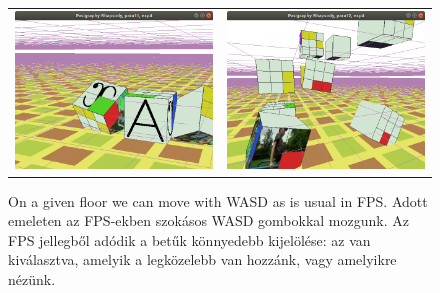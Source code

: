 \documentclass[a4paper]{article}
\begin{document}
\begin{figure}[h]
\begin{tabular}{ll}
\includegraphics[scale=.25, frame]{para112}
&
\includegraphics[scale=.25, frame]{para11}
\end{tabular}
\caption{On a given floor we can move with WASD as is usual in FPS. Adott emeleten az FPS-ekben szokásos WASD gombokkal mozgunk. Az FPS jellegből adódik a betűk könnyedebb kijelölése: az van kiválasztva, amelyik a legközelebb van hozzánk, vagy amelyikre nézünk.}
\label{figpara6}
\end{figure}





\end{document}
